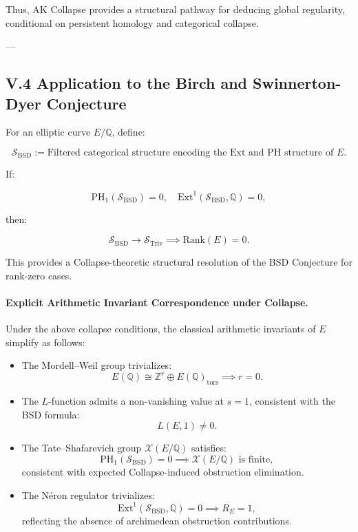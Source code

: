 \documentclass[11pt]{article}
\newcommand{\Sha}{\mathcal{X}}
\begin{document}
Thus, AK Collapse provides a structural pathway for deducing global regularity, conditional on persistent homology and categorical collapse.

---

\subsection*{V.4 Application to the Birch and Swinnerton-Dyer Conjecture}

For an elliptic curve \( E/\mathbb{Q} \), define:

\[
\mathcal{S}_{\mathrm{BSD}} := \text{Filtered categorical structure encoding the Ext and PH structure of } E.
\]

If:

\[
\mathrm{PH}_1(\mathcal{S}_{\mathrm{BSD}}) = 0, \quad \mathrm{Ext}^1(\mathcal{S}_{\mathrm{BSD}}, \mathbb{Q}) = 0,
\]

then:

\[
\mathcal{S}_{\mathrm{BSD}} \longrightarrow \mathcal{S}_{\mathrm{Triv}} \implies \mathrm{Rank}(E) = 0.
\]

This provides a Collapse-theoretic structural resolution of the BSD Conjecture for rank-zero cases.

\paragraph{Explicit Arithmetic Invariant Correspondence under Collapse.}

Under the above collapse conditions, the classical arithmetic invariants of \( E \) simplify as follows:

\begin{itemize}
    \item The Mordell--Weil group trivializes:
    \[
    E(\mathbb{Q}) \cong \mathbb{Z}^r \oplus E(\mathbb{Q})_{\mathrm{tors}} \implies r = 0.
    \]
    
    \item The \( L \)-function admits a non-vanishing value at \( s = 1 \), consistent with the BSD formula:
    \[
    L(E, 1) \neq 0.
    \]
    
    \item The Tate--Shafarevich group \( \Sha(E/\mathbb{Q}) \) satisfies:
    \[
    \mathrm{PH}_1(\mathcal{S}_{\mathrm{BSD}}) = 0 \implies \Sha(E/\mathbb{Q}) \text{ is finite},
    \]
    consistent with expected Collapse-induced obstruction elimination.
    
    \item The Néron regulator trivializes:
    \[
    \mathrm{Ext}^1(\mathcal{S}_{\mathrm{BSD}}, \mathbb{Q}) = 0 \implies R_E = 1,
    \]
    reflecting the absence of archimedean obstruction contributions.
\end{itemize}
\end{document}
